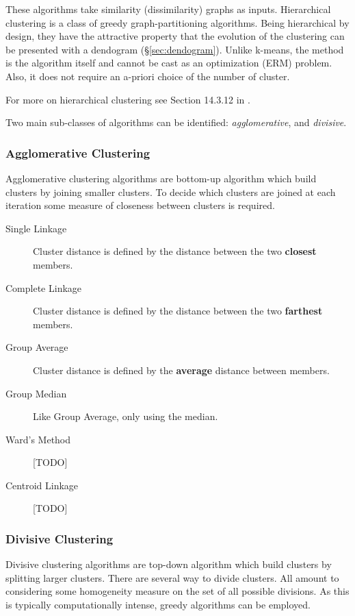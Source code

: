 

These algorithms take similarity (dissimilarity) graphs as inputs.
Hierarchical clustering is a class of greedy graph-partitioning algorithms. 
Being hierarchical by design, they have the attractive property that the evolution of the clustering can be presented with a dendogram (\S\ref{sec:dendogram}).  
Unlike k-means, the method is the algorithm itself and cannot be cast as an optimization (ERM) problem.
Also, it does not require an a-priori choice of the number of cluster.

For more on hierarchical clustering see Section 14.3.12 in \cite{hastie_elements_2003}.

Two main sub-classes of algorithms can be identified: \emph{agglomerative}, and \emph{divisive}.
\subsubsection{Agglomerative Clustering}
Agglomerative clustering algorithms are bottom-up algorithm which build clusters by joining smaller clusters. 
To decide which clusters are joined at each iteration some measure of closeness between clusters is required. 
\begin{description}
\item[Single Linkage] Cluster distance is defined by the distance between the two \textbf{closest} members.
\item[Complete Linkage] Cluster distance is defined by the distance between the two \textbf{farthest} members.
\item[Group Average] Cluster distance is defined by the \textbf{average} distance between members.
\item[Group Median] Like Group Average, only using the median.
\item[Ward's Method] [TODO]
\item[Centroid Linkage] [TODO]
\end{description}

\bigskip

\subsubsection{Divisive Clustering}
Divisive clustering algorithms are top-down algorithm which build clusters by splitting larger clusters. 
There are several way to divide clusters. All amount to considering some homogeneity measure on the set of all possible divisions. As this is typically computationally intense, greedy algorithms can be employed.


